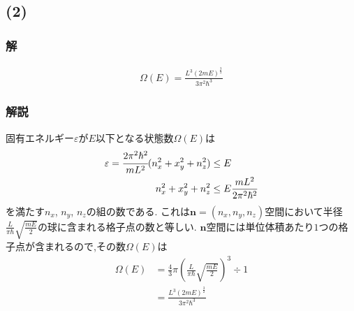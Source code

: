 \subsection*{(2)}
\subsubsection*{解}
\begin{align*}
  \Omega(E)=\frac{L^3(2mE)^{\frac{3}{2}}}{3\pi^2\hbar^3}
\end{align*}
\hrulefill
\subsubsection*{解説}
固有エネルギー$\varepsilon$が$E$以下となる状態数$\Omega(E)$は
\begin{align}
  \varepsilon=\cfrac{2\pi^2\hbar^2}{mL^2}(n_x^2+x_y^2+n_z^2)&\leq E\\
  n_x^2+x_y^2+n_z^2&\leq E\frac{mL^2}{2\pi^2\hbar^2}
\end{align}
を満たす$n_x$, $n_y$, $n_z$の組の数である.
これは$\bm{n}=(n_x,n_y,n_z)$空間において半径$\frac{L}{\pi\hbar}\sqrt{\frac{mE}{2}}$の球に含まれる格子点の数と等しい.
$\bm{n}$空間には単位体積あたり$1$つの格子点が含まれるので,その数$\Omega(E)$は
\begin{align}
  \Omega(E)&=\frac{4}{3}\pi\left(\frac{L}{\pi\hbar}\sqrt{\frac{mE}{2}}\right)^3\div 1\\
  &=\frac{L^3(2mE)^{\frac{3}{2}}}{3\pi^2\hbar^3}
\end{align}